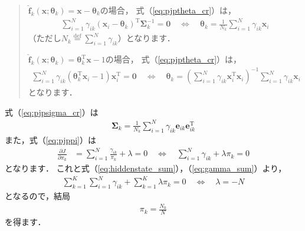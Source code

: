 ﻿\documentclass{jsarticle}
\begin{document}
\begin{quote}
$\hat{\bm{f}}_{k}(\bm{x};\bm{\theta}_{k})=\bm{x}-\bm{\theta}_{k}$の場合，
式（\ref{eq:pjptheta_cr}）は，
\begin{align}
\sum_{i=1}^{N}\gamma_{ik}(\bm{x}_{i}-\bm{\theta}_{k})^{\mathrm{T}}\bm{\Sigma}_{k}^{-1}=\bm{0}
\quad\Leftrightarrow\quad
\bm{\theta}_{k}=\frac{1}{N_{k}}\sum_{i=1}^{N}\gamma_{ik}\bm{x}_{i}
\label{eq:pjptheta_cr_mean}
\end{align}
（ただし$N_{k}\overset{\mathrm{def}}{=}\sum_{i=1}^{N}\gamma_{ik}$）となります．

$\hat{\bm{f}}_{k}(\bm{x};\bm{\theta}_{k})=\bm{\theta}_{k}^{\mathrm{T}}\bm{x}-1$の場合，
式（\ref{eq:pjptheta_cr}）は，
\begin{align}
\sum_{i=1}^{N}\gamma_{ik}(\bm{\theta}_{k}^{\mathrm{T}}\bm{x}_{i}-1)\bm{x}_{i}^{\mathrm{T}}=\bm{0}
\quad\Leftrightarrow\quad
\bm{\theta}_{k}=\left(\sum_{i=1}^{N}\gamma_{ik}\bm{x}_{i}^{\mathrm{T}}\bm{x}_{i}\right)^{-1}\sum_{i=1}^{N}\gamma_{ik}\bm{x}_{i}
\label{eq:pjptheta_cr_lsm}
\end{align}
となります．
\end{quote}

式（\ref{eq:pjpsigma_cr}）は
\begin{align}
\bm{\Sigma}_{k}=\frac{1}{N_{k}}\sum_{i=1}^{N}\gamma_{ik}\bm{e}_{ik}\bm{e}_{ik}^{\mathrm{T}}
\label{eq:sigma_k}
\end{align}
また，式（\ref{eq:pjppi}）は
\begin{align*}
\frac{\partial J}{\partial\pi_{k}}
&=\sum_{i=1}^{N}\frac{\gamma_{ik}}{\pi_{k}}+\lambda=0
\quad\Leftrightarrow\quad
\sum_{i=1}^{N}\gamma_{ik}+\lambda\pi_{k}=0
\end{align*}
となります．
これと式（\ref{eq:hiddenstate_sum}），（\ref{eq:gamma_sum}）より，
\begin{align*}
\sum_{k=1}^{K}\sum_{i=1}^{N}\gamma_{ik}+\sum_{k=1}^{K}\lambda\pi_{k}=0
\quad\Leftrightarrow\quad
\lambda=-N
\end{align*}
となるので，結局
\begin{align}
\pi_{k}=\frac{N_{k}}{N}
\label{eq:pi_k}
\end{align}
を得ます．
\end{document}
